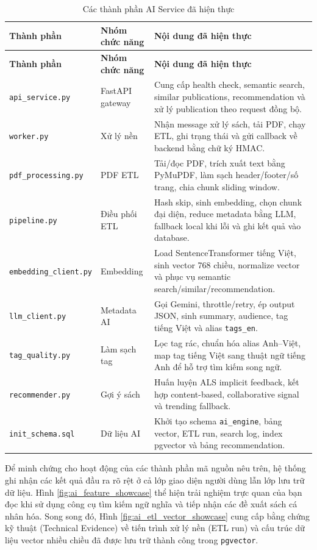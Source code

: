 \begin{longtable}{|p{4.6cm}|p{3.2cm}|p{6.5cm}|}
\caption{Các thành phần AI Service đã hiện thực}
\label{tab:ai_components_implemented}\\
\hline
\textbf{Thành phần} & \textbf{Nhóm chức năng} & \textbf{Nội dung đã hiện thực} \\
\hline
\endfirsthead
\hline
\textbf{Thành phần} & \textbf{Nhóm chức năng} & \textbf{Nội dung đã hiện thực} \\
\hline
\endhead
\texttt{api\_service.py} & FastAPI gateway &
Cung cấp health check, semantic search, similar publications, recommendation và
xử lý publication theo request đồng bộ. \\
\hline
\texttt{worker.py} & Xử lý nền &
Nhận message xử lý sách, tải PDF, chạy ETL, ghi trạng thái và gửi callback về
backend bằng chữ ký HMAC. \\
\hline
\texttt{pdf\_processing.py} & PDF ETL &
Tải/đọc PDF, trích xuất text bằng PyMuPDF, làm sạch header/footer/số trang, chia
chunk sliding window. \\
\hline
\texttt{pipeline.py} & Điều phối ETL &
Hash skip, sinh embedding, chọn chunk đại diện, reduce metadata bằng LLM, fallback
local khi lỗi và ghi kết quả vào database. \\
\hline
\texttt{embedding\_client.py} & Embedding &
Load SentenceTransformer tiếng Việt, sinh vector 768 chiều, normalize vector và
phục vụ semantic search/similar/recommendation. \\
\hline
\texttt{llm\_client.py} & Metadata AI &
Gọi Gemini, throttle/retry, ép output JSON, sinh summary, audience, tag tiếng
Việt và alias \texttt{tags\_en}. \\
\hline
\texttt{tag\_quality.py} & Làm sạch tag &
Lọc tag rác, chuẩn hóa alias Anh--Việt, map tag tiếng Việt sang thuật ngữ tiếng
Anh để hỗ trợ tìm kiếm song ngữ. \\
\hline
\texttt{recommender.py} & Gợi ý sách &
Huấn luyện ALS implicit feedback, kết hợp content-based, collaborative signal và
trending fallback. \\
\hline
\texttt{init\_schema.sql} & Dữ liệu AI &
Khởi tạo schema \texttt{ai\_engine}, bảng vector, ETL run, search log, index
pgvector và bảng recommendation. \\
\hline
\end{longtable}

Để minh chứng cho hoạt động của các thành phần mã nguồn nêu trên, hệ thống ghi nhận các kết quả đầu ra rõ rệt ở cả lớp giao diện người dùng lẫn lớp lưu trữ dữ liệu. Hình \ref{fig:ai_feature_showcase} thể hiện trải nghiệm trực quan của bạn đọc khi sử dụng công cụ tìm kiếm ngữ nghĩa và tiếp nhận các đề xuất sách cá nhân hóa. Song song đó, Hình \ref{fig:ai_etl_vector_showcase} cung cấp bằng chứng kỹ thuật (Technical Evidence) về tiến trình xử lý nền (ETL run) và cấu trúc dữ liệu vector nhiều chiều đã được lưu trữ thành công trong \texttt{pgvector}.

